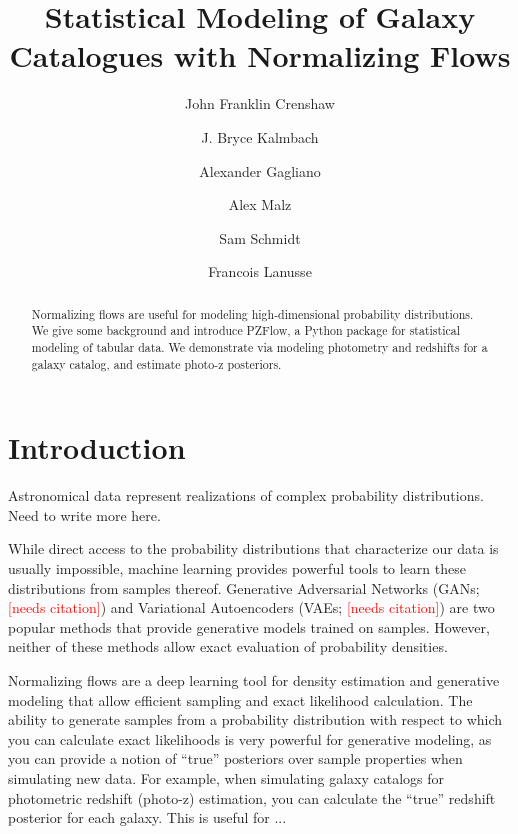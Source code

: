 \documentclass[twocolumn]{aastex631}
\newcommand{\note}[1]{\textsf{\textcolor{red}{#1}}}
\newcommand{\needscite}{\note{[needs citation]}}
\begin{document}
\title{Statistical Modeling of Galaxy Catalogues with Normalizing Flows}


\author[0000-0002-2495-3514]{John Franklin Crenshaw}

\author{J. Bryce Kalmbach}

\author{Alexander Gagliano}

\author{Alex Malz}

\author{Sam Schmidt}

\author{Francois Lanusse}


\begin{abstract}
    Normalizing flows are useful for modeling high-dimensional probability distributions.
    We give some background and introduce PZFlow, a Python package for statistical modeling of tabular data.
    We demonstrate via modeling photometry and redshifts for a galaxy catalog, and estimate photo-z posteriors.
    \end{abstract}

\section{Introduction}
\label{sec:intro}

Astronomical data represent realizations of complex probability distributions.
Need to write more here.

While direct access to the probability distributions that characterize our data is usually impossible, machine learning provides powerful tools to learn these distributions from samples thereof.
Generative Adversarial Networks (GANs; \needscite) and Variational Autoencoders (VAEs; \needscite) are two popular methods that provide generative models trained on samples.
However, neither of these methods allow exact evaluation of probability densities.

Normalizing flows are a deep learning tool for density estimation and generative modeling that allow efficient sampling and exact likelihood calculation.
The ability to generate samples from a probability distribution with respect to which you can calculate exact likelihoods is very powerful for generative modeling, as you can provide a notion of ``true'' posteriors over sample properties when simulating new data.
For example, when simulating galaxy catalogs for photometric redshift (photo-z) estimation, you can calculate the ``true'' redshift posterior for each galaxy.
This is useful for ...
\end{document}

